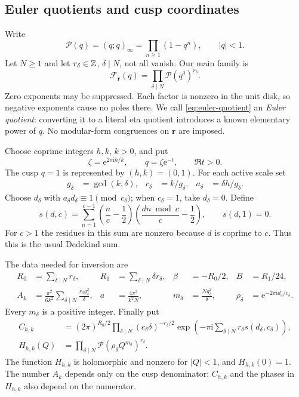 \documentclass[11pt,a4paper]{article}
\numberwithin{equation}{section}
\theoremstyle{definition}\newtheorem{definition}[theorem]{Definition}
\theoremstyle{remark}\newtheorem{remark}[theorem]{Remark}
\newcommand{\ii}{\mathrm i}\newcommand{\e}{\mathrm e}
\newcommand{\Poch}{\mathcal P}\newcommand{\F}{\mathcal F}
\newcommand{\vct}[1]{\boldsymbol{#1}}
\begin{document}
\subsection{Euler quotients and cusp coordinates}
Write
\[
 \Poch(q)=(q;q)_\infty=\prod_{n\ge1}(1-q^n),\qquad |q|<1.
\]
Let $N\ge1$ and let $r_\delta\in\mathbb Z$, $\delta\mid N$, not all vanish.
Our main family is
\begin{equation}\label{eq:euler-quotient}
 \F_{\vct r}(q)=\prod_{\delta\mid N}\Poch(q^\delta)^{r_\delta}.
\end{equation}
Zero exponents may be suppressed. Each factor is nonzero in the unit
 disk, so negative exponents cause no poles there. We call
\eqref{eq:euler-quotient} an \emph{Euler quotient}: converting it to a
literal eta quotient introduces a known elementary power of $q$.
No modular-form congruences on $\vct r$ are imposed.

Choose coprime integers $h,k$, $k>0$, and put
\[
 \zeta=\e^{2\pi\ii h/k},\qquad q=\zeta\e^{-t},\qquad \Re t>0.
\]
The cusp $q=1$ is represented by $(h,k)=(0,1)$. For each active scale set
\begin{align}
 g_\delta&=\gcd(k,\delta),& c_\delta&=k/g_\delta,&
 a_\delta&=\delta h/g_\delta.\label{eq:cusp-integers}
\end{align}
Choose $d_\delta$ with $a_\delta d_\delta\equiv1\pmod{c_\delta}$;
when $c_\delta=1$, take $d_\delta=0$. Define
\begin{equation}\label{eq:dedekind}
 s(d,c)=\sum_{n=1}^{c-1}
 \left(\frac nc-\frac12\right)
 \left(\frac{dn\bmod c}{c}-\frac12\right),\qquad s(d,1)=0.
\end{equation}
For $c>1$ the residues in this sum are nonzero because $d$ is coprime
to $c$. Thus this is the usual Dedekind sum.

The data needed for inversion are
\begin{align}
 R_0&=\sum_{\delta\mid N}r_\delta,&
 R_1&=\sum_{\delta\mid N}\delta r_\delta,&
 \beta&=-R_0/2,& B&=R_1/24,\label{eq:R-data}\\
 A_k&=\frac{\pi^2}{6k^2}
       \sum_{\delta\mid N}\frac{r_\delta g_\delta^2}{\delta},
 & a&=\frac{4\pi^2}{k^2N},&
 m_\delta&=\frac{Ng_\delta^2}{\delta},&
 \rho_\delta&=\e^{-2\pi\ii d_\delta/c_\delta}.\label{eq:A-data}
\end{align}
Every $m_\delta$ is a positive integer. Finally put
\begin{align}
 C_{h,k}
 &=(2\pi)^{R_0/2}
 \prod_{\delta\mid N}(c_\delta\delta)^{-r_\delta/2}
 \exp\left(-\pi\ii\sum_{\delta\mid N}
                 r_\delta s(d_\delta,c_\delta)\right),
 \label{eq:C-data}\\
 H_{h,k}(Q)&=\prod_{\delta\mid N}
                \Poch(\rho_\delta Q^{m_\delta})^{r_\delta}.
 \label{eq:H-data}
\end{align}
The function $H_{h,k}$ is holomorphic and nonzero for $|Q|<1$, and
$H_{h,k}(0)=1$. The number $A_k$ depends only on the cusp denominator;
$C_{h,k}$ and the phases in $H_{h,k}$ also depend on the numerator.
\end{document}
